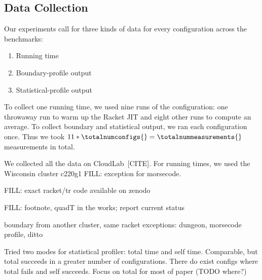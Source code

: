 \subsection{Data Collection}


Our experiments call for three kinds of data for every configuration across the benchmarks:
\begin{enumerate}
  \item Running time
  \item Boundary-profile output
  \item Statistical-profile output
\end{enumerate}

To collect one running time, we used nine runs of the configuration:
one throwaway run to warm up the Racket JIT and eight other runs to compute an average.
To collect boundary and statistical output, we ran each configuration once.
Thus we took $11 * \totalnumconfigs{} = \totalnummeasurements{}$ measurements in total.

We collected all the data on CloudLab~[CITE].
For running times, we used the Wisconsin cluster c220g1 
FILL: exception for morsecode.

FILL: exact racket/tr code available on zenodo

FILL: footnote, quadT in the works; report current status

boundary from another cluster, same racket
exceptions: dungeon, morsecode
profile, ditto

Tried two modes for statistical profiler: total time and self time.
Comparable, but total succeeds in a greater number of configurations.
There do exist configs where total fails and self succeeds.
Focus on total for most of paper (TODO where?)


